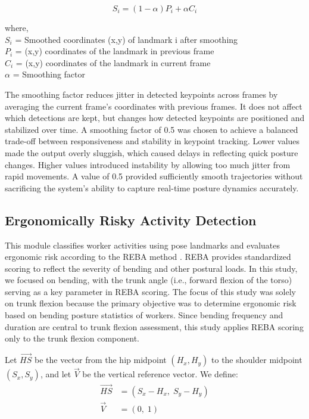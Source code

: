 \documentclass[11pt]{article}
\begin{document}
\begin{equation}
     S_i = (1 - \alpha)P_i + \alpha C_i
\end{equation}

where, 
\\ $S_i$ = Smoothed coordinates (x,y) of landmark i after smoothing
\\ $P_i$ = (x,y) coordinates of the landmark in previous frame
\\ $C_i$ = (x,y) coordinates of the landmark in current frame
\\ $\alpha$ = Smoothing factor

The smoothing factor reduces jitter in detected keypoints across frames by averaging the current frame’s coordinates with previous frames. It does not affect which detections are kept, but changes how detected keypoints are positioned and stabilized over time. A smoothing factor of 0.5 was chosen to achieve a balanced trade-off between responsiveness and stability in keypoint tracking. Lower values made the output overly sluggish, which caused delays in reflecting quick posture changes. Higher values introduced instability by allowing too much jitter from rapid movements. A value of 0.5 provided sufficiently smooth trajectories without sacrificing the system’s ability to capture real-time posture dynamics accurately. 

\subsection{Ergonomically Risky Activity Detection}
This module classifies worker activities using pose landmarks and evaluates ergonomic risk according to the REBA method \citep{hignett2000rapid}. REBA provides standardized scoring to reflect the severity of bending and other postural loads. In this study, we focused on bending, with the trunk angle (i.e., forward flexion of the torso) serving as a key parameter in REBA scoring. The focus of this study was solely on trunk flexion because the primary objective was to determine ergonomic risk based on bending posture statistics of workers. Since bending frequency and duration are central to trunk flexion assessment, this study applies REBA scoring only to the trunk flexion component.

Let \(\vec{HS}\) be the vector from the hip midpoint \((H_x, H_y)\) to the shoulder midpoint \((S_x, S_y)\), and let \(\vec{V}\) be the vertical reference vector. We define:
\begin{align}
    \vec{HS} & = (S_x - H_x,\; S_y - H_y)\\
    \vec{V} & = (0,\; 1)
\end{align}  
\end{document}
